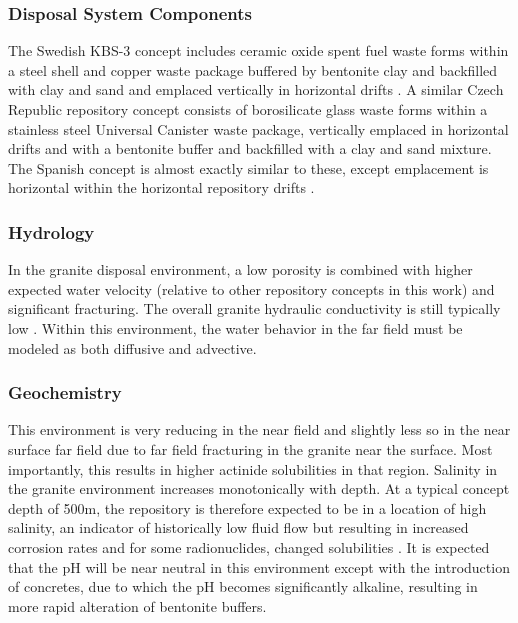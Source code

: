 

\subsubsection{Disposal System Components}

The Swedish KBS-3 concept includes ceramic oxide spent fuel waste forms within a 
steel shell and copper waste package buffered by bentonite clay and backfilled 
with clay and sand and emplaced vertically in horizontal drifts 
\cite{ab_long-term_2006}.
A similar Czech Republic repository concept consists of 
borosilicate glass waste forms within a stainless steel Universal Canister waste 
package, vertically emplaced in horizontal drifts and with a bentonite buffer  
and backfilled with a clay and sand mixture.
The Spanish concept is almost exactly similar to 
these, except emplacement is horizontal within the horizontal repository drifts
\cite{ von_lensa_red-impact_2008}.




\subsubsection{Hydrology}

In the granite disposal environment, a low porosity is combined with 
higher expected water velocity (relative to other repository concepts in this 
work) and significant fracturing. The overall 
granite hydraulic conductivity is still typically low
\cite{schwartz_fundamentals_2004, 
hardin_generic_2011}. Within this environment, the  
water behavior in the far field must be modeled as both diffusive and advective.

\subsubsection{Geochemistry}

This environment is very reducing in the near field and slightly less so in the 
near surface far field due to far field fracturing in the granite near the 
surface. Most importantly, this results in higher actinide solubilities in that 
region. Salinity in the granite environment increases monotonically with depth. 
At a typical concept depth of 500m, the repository is therefore expected to be 
in a location of high salinity, an indicator of historically low fluid flow but 
resulting in increased corrosion rates and for some radionuclides, changed 
solubilities \cite{andra_granite:_2005}.  It is expected that the pH will be 
near neutral in this environment except with  the introduction of concretes, 
due to which the pH becomes significantly alkaline, resulting in more rapid 
alteration of bentonite buffers. 


